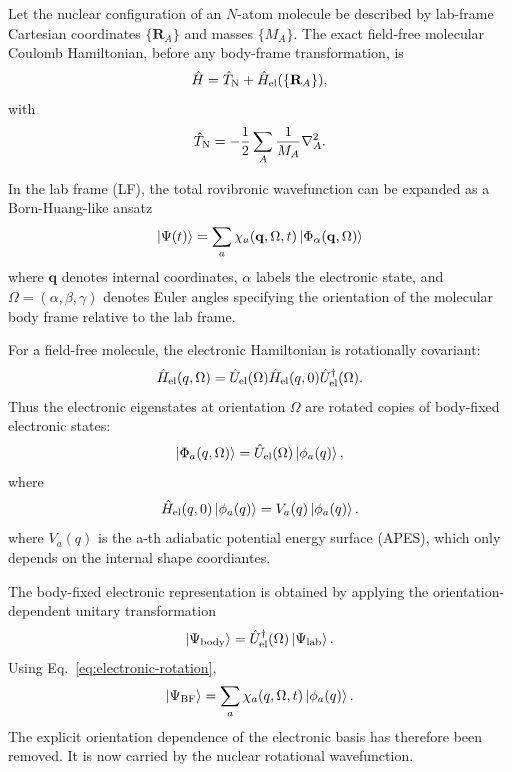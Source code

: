 \documentclass[11pt]{revtex4-2}
\begin{document}
Let the nuclear configuration of an $N$-atom molecule be described by
lab-frame Cartesian coordinates $\{\mathbf{R}_A\}$ and masses $\{M_A\}$.
The exact field-free molecular Coulomb Hamiltonian, before any body-frame
transformation, is
\begin{equation}
	\hat{H}
	=
	\hat{T}_\text{N}
	+
	\hat{H}_{\rm el}(\{\mathbf{R}_A\}),
\end{equation}
with
\begin{equation}
	\hat{T}_{\rm N}
	=
	-\frac{1}{2}
	\sum_A \frac{1}{M_A}
	\nabla^2_{A}.
\end{equation}

In the lab frame (LF), the total rovibronic wavefunction can be expanded as a Born-Huang-like ansatz
\cite{bornhuang1954,bunkerjensen1998,watson1968,zare1988}
\begin{equation}
	\ket{\Psi(t)}
	=
	\sum_a
	\chi_a(\mathbf{q},\Omega,t)
	\ket{\Phi_\alpha(\mathbf{q},\Omega)}
	\label{eq:lab-expansion}
\end{equation}
where $\mathbf{q}$ denotes internal coordinates, $\alpha$ labels the electronic state, and
$
\Omega = (\alpha,\beta,\gamma)
$
denotes Euler angles specifying the orientation of the molecular body frame
relative to the lab frame.

For a field-free molecule, the electronic Hamiltonian is rotationally
covariant:
\begin{equation}
	\hat{H}_{\rm el}(q,\Omega)
	=
	\hat{U}_{\rm el}(\Omega)
	\hat{H}_{\rm el}(q,0)
	\hat{U}_{\rm el}^\dagger(\Omega).
\end{equation}
Thus the electronic eigenstates at orientation $\Omega$ are rotated copies
of body-fixed electronic states:
\begin{equation}
	\ket{\Phi_a(q,\Omega)}
	=
	\hat{U}_{\rm el}(\Omega)
	\ket{\phi_a(q)} ,
	\label{eq:electronic-rotation}
\end{equation}
where
\begin{equation}
	\hat{H}_{\rm el}(q,0)\ket{\phi_a(q)}
	=
	V_a(q)\ket{\phi_a(q)} .
\end{equation}
where $V_a(q)$ is the a-th adiabatic potential energy surface (APES), which only depends on the internal shape coordiantes. 

The body-fixed electronic representation is obtained by applying the orientation-dependent unitary transformation
\begin{equation}
	\ket{\Psi_{\rm body}}
	=
	\hat{U}_{\rm el}^\dagger(\Omega) \ket{\Psi_{\rm lab}} .
\end{equation}
Using Eq.~\eqref{eq:electronic-rotation},
\begin{equation}
	\ket{\Psi_{\rm BF}}
	=
	\sum_a
	\chi_a(q,\Omega,t)
	\ket{\phi_a(q)} .
\end{equation}
The explicit orientation dependence of the electronic basis has therefore
been removed.  It is now carried by the nuclear rotational wavefunction.
\end{document}
